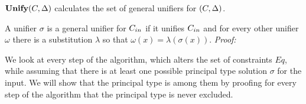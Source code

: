 \begin{theorem}[Completeness]\label{theo:unifyCompleteness}
  $\textbf{Unify}{} (C, \Delta)$ calculates {the set} of general
  unifiers for $(C, \Delta)$. 
\end{theorem}
A unifier $\sigma$ is a general unifier for $C_{in}$ if it unifies $C_{in}$
and for every other unifier $\omega$ there is a substitution $\lambda$ so that $\omega(x) = \lambda(\sigma(x))$.
\textit{Proof:}

We look at every step of the algorithm, which alters the set of constraints $Eq$,
while assuming that there is at least one possible principal type solution $\sigma$ for the input.
We will show that the principal type is among them by proofing for every step of the algorithm that the principal type is never excluded.


